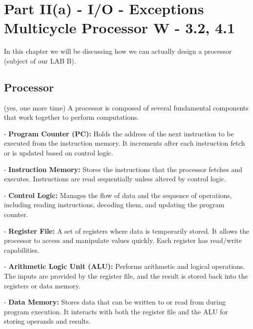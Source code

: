\chapter{Part II(a) - I/O - Exceptions Multicycle Processor W - 3.2, 4.1}
\footnotesize
In this chapter we will be discussing how we can actually design a processor (subject of our LAB B). \\
\section{Processor}
\begin{minipage}[htp]{0.45\textwidth}
\footnotesize
(yes, one more time) A processor is composed of several fundamental components that work together to perform computations.  \\ \vspace*{5px}

- \textbf{Program Counter (PC):} Holds the address of the next instruction to be executed from the instruction memory. It increments after each instruction fetch or is updated based on control logic.   \\ \vspace*{5px}                

- \textbf{Instruction Memory:} Stores the instructions that the processor fetches and executes. Instructions are read sequentially unless altered by control logic. \\ \vspace*{5px}

- \textbf{Control Logic:} Manages the flow of data and the sequence of operations, including reading instructions, decoding them, and updating the program counter. \\ \vspace*{5px}

- \textbf{Register File:} A set of registers where data is temporarily stored. It allows the processor to access and manipulate values quickly. Each register has read/write capabilities.  \\ \vspace*{5px}

- \textbf{Arithmetic Logic Unit (ALU):} Performs arithmetic and logical operations. The inputs are provided by the register file, and the result is stored back into the registers or data memory. \\ \vspace*{5px}
    
- \textbf{Data Memory:} Stores data that can be written to or read from during program execution. It interacts with both the register file and the ALU for storing operands and results. \\ \vspace*{5px}
\end{minipage}
